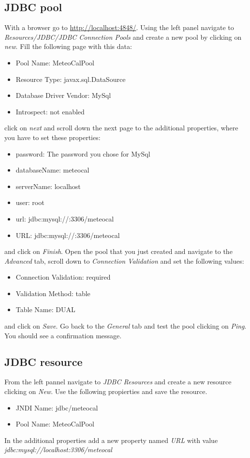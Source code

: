 \documentclass[10pt,a4paper,titlepage]{article}
\begin{document}
\subsection{JDBC pool}
With a browser go to \url{http://localhost:4848/}. Using the left panel navigate to \emph{Resources/JDBC/JDBC Connection Pools} and create a new pool by clicking on \emph{new}. Fill the following page with this data:
\begin{itemize}
\item Pool Name: MeteoCalPool
\item Resource Type: javax.sql.DataSource
\item Database Driver Vendor: MySql
\item Introspect: not enabled
\end{itemize}
click on \emph{next} and scroll down the next page to the additional properties, where you have to set these properties:
\begin{itemize}
\item password: The password you chose for MySql
\item databaseName: meteocal
\item serverName: localhost
\item user: root
\item url: jdbc:mysql://:3306/meteocal
\item URL: jdbc:mysql://:3306/meteocal
\end{itemize}
and click on \emph{Finish}. Open the pool that you just created and navigate to the \emph{Advanced} tab, scroll down to \emph{Connection Validation} and set the following values:
\begin{itemize}
\item Connection Validation: required
\item Validation Method: table
\item Table Name: DUAL
\end{itemize}
and click on \emph{Save}. Go back to the \emph{General} tab and test the pool clicking on \emph{Ping}. You should see a confirmation message.

\subsection{JDBC resource}
From the left pannel navigate to \emph{JDBC Resources} and create a new resource clicking on \emph{New}. Use the following propierties and save the resource.
\begin{itemize}
\item JNDI Name: jdbc/meteocal
\item Pool Name: MeteoCalPool
\end{itemize}
In the additional properties add a new property named \emph{URL} with value \linebreak \emph{jdbc:mysql://localhost:3306/meteocal}
\end{document}
